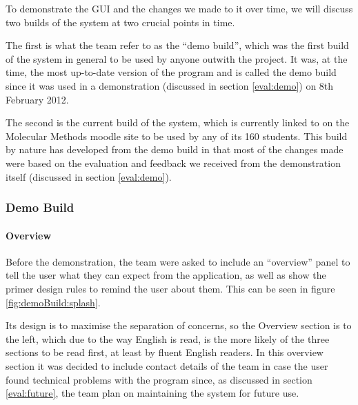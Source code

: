 To demonstrate the GUI and the changes we made to it over time, we
will discuss two builds of the system at two crucial points in time.

The first is what the team refer to as the ``demo build'', which was
the first build of the system in general to be used by anyone outwith
the project.
It was, at the time, the most up-to-date version of the program and is
called the demo build since it was used in a demonstration (discussed
in section \ref{eval:demo}) on 8th February 2012.

The second is the current build of the system, which is currently
linked to on the Molecular Methods moodle site to be used by any of
its 160 students.
This build by nature has developed from the demo build in that most of
the changes made were based on the evaluation and feedback we received
from the demonstration itself (discussed in section \ref{eval:demo}).

\subsubsection{Demo Build}

\paragraph{Overview}

Before the demonstration, the team were asked to include an
``overview'' panel to tell the user what they can expect from the
application, as well as show the primer design rules to remind the
user about them.
This can be seen in figure \ref{fig:demoBuild:splash}.

Its design is to maximise the separation of concerns, so the Overview
section is to the left, which due to the way English is read, is the
more likely of the three sections to be read first, at least by fluent
English readers.
In this overview section it was decided to include contact details
of the team in case the user found technical problems with the
program since, as discussed in section \ref{eval:future}, the
team plan on maintaining the system for future use.


